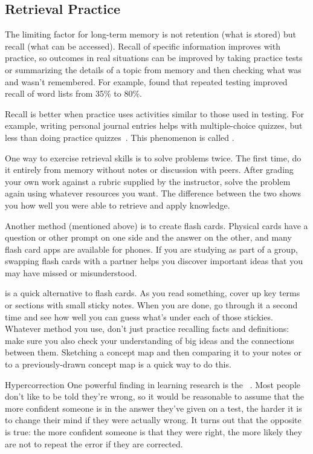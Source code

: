 \subsection*{Retrieval Practice}

The limiting factor for long-term memory is not retention (what is stored)
but recall (what can be accessed).
Recall of specific information improves with practice,
so outcomes in real situations can be improved
by taking practice tests or summarizing the details of a topic from memory
and then checking what was and wasn't remembered.
For example,
\cite{Karp2008} found that repeated testing improved recall of word lists from 35\% to 80\%.

Recall is better when practice uses activities similar to those used in testing.
For example,
writing personal journal entries helps with multiple-choice quizzes,
but less than doing practice quizzes~\cite{Mill2016a}.
This phenomenon is called
.

One way to exercise retrieval skills is to solve problems twice.
The first time,
do it entirely from memory without notes or discussion with peers.
After grading your own work against a rubric supplied by the instructor,
solve the problem again using whatever resources you want.
The difference between the two shows you how well you were able to retrieve and apply knowledge.

Another method (mentioned above) is to create flash cards.
Physical cards have a question or other prompt on one side and the answer on the other,
and many flash card apps are available for phones.
If you are studying as part of a group,
swapping flash cards with a partner
helps you discover important ideas that you may have missed or misunderstood.

 is a quick alternative to flash cards.
As you read something,
cover up key terms or sections with small sticky notes.
When you are done,
go through it a second time and see how well you can guess what's under each of those stickies.
Whatever method you use,
don't just practice recalling facts and definitions:
make sure you also check your understanding of big ideas
and the connections between them.
Sketching a concept map and then comparing it to your notes
or to a previously-drawn concept map
is a quick way to do this.

\begin{aside}{Hypercorrection}
  One powerful finding in learning research is
  the ~\cite{Metc2016}.
  Most people don't like to be told they're wrong,
  so it would be reasonable to assume that
  the more confident someone is in the answer they've given on a test,
  the harder it is to change their mind if they were actually wrong.
  It turns out that the opposite is true:
  the more confident someone is that they were right,
  the more likely they are not to repeat the error if they are corrected.
\end{aside}

